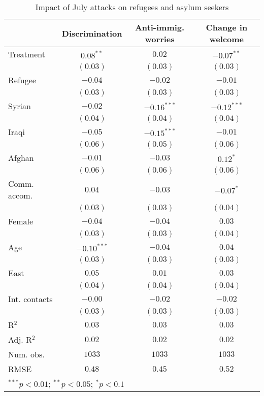 
\begin{table}
\caption{Impact of July attacks on refugees and asylum seekers}
\begin{center}
\begin{tabular}{l c c c}
\toprule
 & Discrimination & Anti-immig. worries & Change in welcome \\
\midrule
Treatment     & $0.08^{**}$   & $0.02$        & $-0.07^{**}$  \\
              & $(0.03)$      & $(0.03)$      & $(0.03)$      \\
Refugee       & $-0.04$       & $-0.02$       & $-0.01$       \\
              & $(0.03)$      & $(0.03)$      & $(0.03)$      \\
Syrian        & $-0.02$       & $-0.16^{***}$ & $-0.12^{***}$ \\
              & $(0.04)$      & $(0.04)$      & $(0.04)$      \\
Iraqi         & $-0.05$       & $-0.15^{***}$ & $-0.01$       \\
              & $(0.06)$      & $(0.05)$      & $(0.06)$      \\
Afghan        & $-0.01$       & $-0.03$       & $0.12^{*}$    \\
              & $(0.06)$      & $(0.06)$      & $(0.06)$      \\
Comm. accom.  & $0.04$        & $-0.03$       & $-0.07^{*}$   \\
              & $(0.03)$      & $(0.03)$      & $(0.04)$      \\
Female        & $-0.04$       & $-0.04$       & $0.03$        \\
              & $(0.03)$      & $(0.03)$      & $(0.04)$      \\
Age           & $-0.10^{***}$ & $-0.04$       & $0.04$        \\
              & $(0.03)$      & $(0.03)$      & $(0.03)$      \\
East          & $0.05$        & $0.01$        & $0.03$        \\
              & $(0.04)$      & $(0.04)$      & $(0.04)$      \\
Int. contacts & $-0.00$       & $-0.02$       & $-0.02$       \\
              & $(0.03)$      & $(0.03)$      & $(0.03)$      \\
\midrule
R$^2$         & $0.03$        & $0.03$        & $0.03$        \\
Adj. R$^2$    & $0.02$        & $0.02$        & $0.02$        \\
Num. obs.     & $1033$        & $1033$        & $1033$        \\
RMSE          & $0.48$        & $0.45$        & $0.52$        \\
\bottomrule
\multicolumn{4}{l}{\scriptsize{$^{***}p<0.01$; $^{**}p<0.05$; $^{*}p<0.1$}}
\end{tabular}
\label{tab_host}
\end{center}
\end{table}
